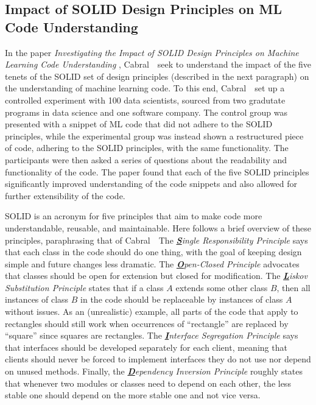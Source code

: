 \subsection*{Impact of SOLID Design Principles on ML Code Understanding}
In the paper \emph{Investigating the Impact of SOLID Design
Principles on Machine Learning Code Understanding} \cite{CKBVEL24SOLID}, Cabral~\etal\ seek to understand the impact of the five tenets of the SOLID set of design principles (described in the next paragraph) on the understanding of machine learning code. To this end, Cabral~\etal\ set up a controlled experiment with 100 data scientists, sourced from two gradutate programs in data science and one software company. The control group was presented with a snippet of ML code that did not adhere to the SOLID principles, while the experimental group was instead shown a restructured piece of code, adhering to the SOLID principles, with the same functionality. The participants were then asked a series of questions about the readability and functionality of the code. The paper found that each of the five SOLID principles significantly improved understanding of the code snippets and also allowed for further extensibility of the code. 

SOLID is an acronym for five principles that aim to make code more understandable, reusable, and maintainable. Here follows a brief overview of these principles, paraphrasing that of Cabral~\etal\ The \emph{\textbf{\underline{S}}ingle Responsibility Principle} says that each class in the code should do one thing, with the goal of keeping design simple and future changes less dramatic. The \emph{\textbf{\underline{O}}pen-Closed Principle} advocates that classes should be open for extension but closed for modification. The \emph{\textbf{\underline{L}}iskov Substitution Principle} states that if a class $A$ extends some other class $B$, then all instances of class $B$ in the code should be replaceable by instances of class $A$ without issues. As an (unrealistic) example, all parts of the code that apply to rectangles should still work when occurrences of ``rectangle'' are replaced by ``square'' since squares are rectangles. The \emph{\textbf{\underline{I}}nterface Segregation Principle} says that interfaces should be developed separately for each client, meaning that clients should never be forced to implement interfaces they do not use nor depend on unused methods. Finally, the \emph{\textbf{\underline{D}}ependency Inversion Principle} roughly states that whenever two modules or classes need to depend on each other, the less stable one should depend on the more stable one and not vice versa. 

